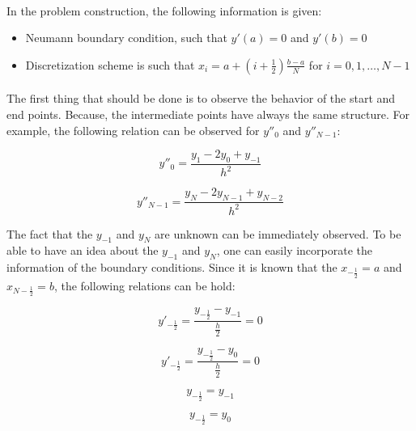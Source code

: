 \documentclass[letterpaper,12pt]{article}
\begin{document}
\paragraph{} In the problem construction, the following information is given:
\begin{itemize}
    \item Neumann boundary condition, such that $y'(a) = 0$ and  $y'(b) = 0$
    \item Discretization scheme is such that $x_i = a + \left(i + \frac{1}{2}\right)\frac{b-a}{N}$ for $i = 0, 1, \dots, N-1$
\end{itemize}

\paragraph{} The first thing that should be done is to observe the behavior of the start and end points. Because, the intermediate points have always the same structure. For example, the following relation can be observed for $y''_{0}$ and $y''_{N-1}$:

\begin{equation}
    \label{eq:y0dd}
    y''_0 = \frac{y_1 -2y_0+y_{-1}}{h^2}
\end{equation}

\begin{equation}
    \label{eq:yNdd}
    y''_{N-1} = \frac{y_{N} -2y_{N-1}+y_{N-2}}{h^2}
\end{equation}

The fact that the $y_{-1}$ and $y_{N}$ are unknown can be immediately observed. To be able to have an idea about the $y_{-1}$ and $y_{N}$, one can easily incorporate the information of the boundary conditions. Since it is known that the $x_{-\frac{1}{2}} = a$ and $x_{N-\frac{1}{2}} = b$, the following relations can be hold:

\begin{equation*}
    y'_{-\frac{1}{2}} = \frac{y_{-\frac{1}{2}} - y_{-1}}{\frac{h}{2}} = 0
\end{equation*}

\begin{equation*}
    y'_{-\frac{1}{2}} = \frac{y_{-\frac{1}{2}} - y_{0}}{\frac{h}{2}} = 0
\end{equation*}

\begin{equation*}
    y_{-\frac{1}{2}} = y_{-1}
\end{equation*}

\begin{equation*}
    y_{-\frac{1}{2}} = y_{0}
\end{equation*}
\end{document}

